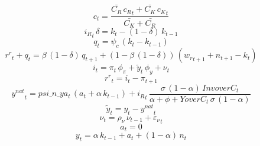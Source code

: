 \begin{dmath}
{{c}_{t}}=\frac{{\bar{C_R}}\, {{c_R}_{t}}+{\bar{C_K}}\, {{c_K}_{t}}}{{\bar{C_K}}+{\bar{C_R}}}
\end{dmath}
\begin{dmath}
{{i_R}_{t}}\, {{\delta}}={{k}_{t}}-\left(1-{{\delta}}\right)\, {{k}_{t-1}}
\end{dmath}
\begin{dmath}
{{q}_{t}}={{\psi_c}}\, \left({{k}_{t}}-{{k}_{t-1}}\right)
\end{dmath}
\begin{dmath}
{{r^r}_{t}}+{{q}_{t}}={{\beta}}\, \left(1-{{\delta}}\right)\, {{q}_{t+1}}+\left(1-{{\beta}}\, \left(1-{{\delta}}\right)\right)\, \left({{w_r}_{t+1}}+{{n}_{t+1}}-{{k}_{t}}\right)
\end{dmath}
\begin{dmath}
{{i}_{t}}={{\pi}_{t}}\, {{\phi_{\pi}}}+{{\tilde y}_{t}}\, {{\phi_{y}}}+{{\nu}_{t}}
\end{dmath}
\begin{dmath}
{{r^r}_{t}}={{i}_{t}}-{{\pi}_{t+1}}
\end{dmath}
\begin{dmath}
{{y^{nat}}_{t}}={psi\_n\_ya_{t}}\, \left({{a}_{t}}+{{\alpha}}\, {{k}_{t-1}}\right)+{{i_R}_{t}}\, \frac{{{\sigma}}\, \left(1-{{\alpha}}\right)\, {InvoverC_{t}}}{{{\alpha}}+{{\phi}}+{YoverC_{t}}\, {{\sigma}}\, \left(1-{{\alpha}}\right)}
\end{dmath}
\begin{dmath}
{{\tilde y}_{t}}={{y}_{t}}-{{y^{nat}}_{t}}
\end{dmath}
\begin{dmath}
{{\nu}_{t}}={{\rho_{\nu}}}\, {{\nu}_{t-1}}+{{\varepsilon_\nu}_{t}}
\end{dmath}
\begin{dmath}
{{a}_{t}}=0
\end{dmath}
\begin{dmath}
{{y}_{t}}={{\alpha}}\, {{k}_{t-1}}+{{a}_{t}}+\left(1-{{\alpha}}\right)\, {{n}_{t}}
\end{dmath}
